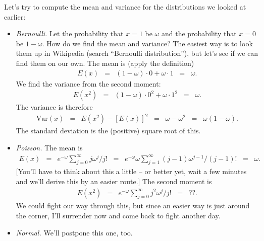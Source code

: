 Let's try to compute the mean and variance for the distributions
we looked at earlier:
%
\begin{itemize}
\item {\it Bernoulli.\/}
Let the probability that $x=1$ be $\omega$ and the probability that $x=0$ be $1-\omega$.
How do we find the mean and variance?
The easiest way is to look them up in Wikipedia (search ``Bernoulli distribution''),
but let's see if we can find them on our own.
The mean is (apply the definition)
\begin{eqnarray*}
    E(x) &=&  (1-\omega) \cdot 0 + \omega \cdot 1
            \;\;=\;\; \omega.
\end{eqnarray*}
We find the variance from the second moment:
\begin{eqnarray*}
    E(x^2) &=&  (1-\omega) \cdot 0^2 + \omega \cdot 1^2
            \;\;=\;\; \omega.
\end{eqnarray*}
The variance is therefore
\begin{eqnarray*}
    \mbox{Var}(x) &=& E(x^2) - [E(x)]^2
            \;\;=\;\;  \omega - \omega^2
            \;\;=\;\; \omega (1-\omega) .
\end{eqnarray*}
The standard deviation is the (positive) square root of this.


\item {\it Poisson.\/}
The mean is
\begin{eqnarray*}
    E(x) &=& e^{-\omega} \sum_{j=0}^\infty j \omega^j/j!
            \;\;=\;\; e^{-\omega} \omega \sum_{j=1}^\infty (j-1) \omega^{j-1}/(j-1)!
            \;\;=\;\; \omega .
\end{eqnarray*}
[You'll have to think about this a little -- or better yet, wait a few minutes and
we'll derive this by an easier route.]
The second moment is
\begin{eqnarray*}
    E(x^2) &=& e^{-\omega} \sum_{j=0}^\infty j^2 \omega^j/j!
            \;\;=\;\;  ??.
\end{eqnarray*}
We could fight our way through this,
but since an easier way is just around the corner,
I'll surrender now and come back to fight another day.


\item {\it Normal.\/}
We'll postpone this one, too.
\end{itemize}

